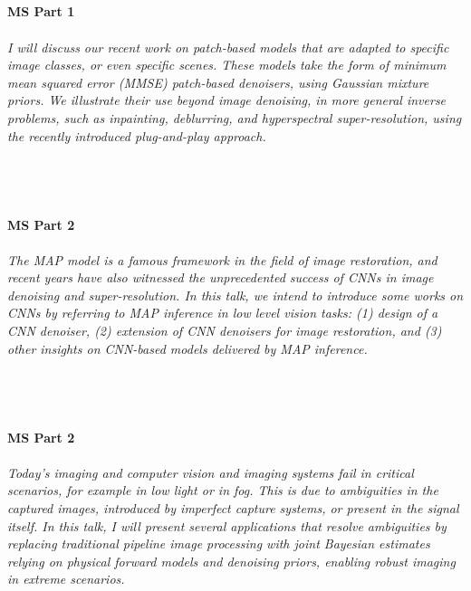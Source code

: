 \begin{multicols}{2}
\\ 
    \\
    \\\\
    \noindent\textbf{MS Part 1}\\
\\  
    \textit{I will discuss our recent work on patch-based models that are adapted to specific image classes, or even specific scenes. These models take the form of minimum mean squared error (MMSE) patch-based denoisers, using Gaussian mixture priors. We illustrate their use beyond image denoising, in more general inverse problems, such as inpainting, deblurring, and hyperspectral super-resolution, using the recently introduced plug-and-play approach.}\\
\\ 
    \\
    \\\\
    \noindent\textbf{MS Part 2}\\
\\  
    \textit{The MAP model is a famous framework in the field of image restoration, and recent years have also witnessed the unprecedented success of CNNs in image denoising and super-resolution. In this talk, we intend to introduce some works on CNNs by referring to MAP inference in low level vision tasks: (1) design of a CNN denoiser, (2) extension of CNN denoisers for image restoration, and (3) other insights on CNN-based models delivered by MAP inference. }\\
\\ 
    \\
    \\\\
    \noindent\textbf{MS Part 2}\\
\\  
    \textit{Today's imaging and computer vision and imaging systems fail in critical scenarios, for example in low light or in fog. This is due to ambiguities in the captured images, introduced by imperfect capture systems, or present in the signal itself. In this talk, I will present several applications that resolve ambiguities by replacing traditional pipeline image processing with joint Bayesian estimates relying on physical forward models and denoising priors, enabling robust imaging in extreme scenarios.}\\
\\ 

\end{multicols}
